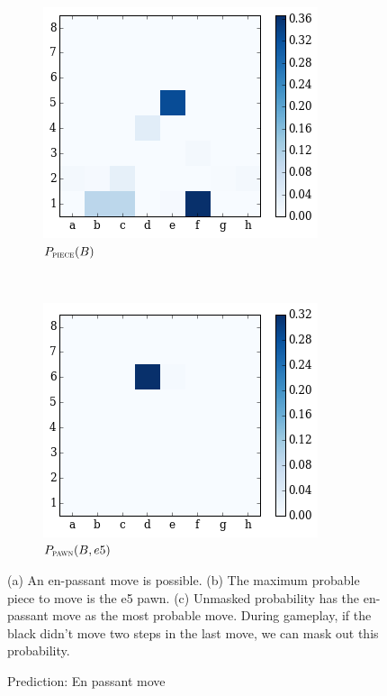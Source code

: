 \begin{figure}[H]
 \hspace*{-0.5in}  
    \begin{subfigure}[t]{0.5\textwidth}
        \centering
        \includegraphics[width=\textwidth]{img/best_moves/output_38_2.png}
        \caption{$P_{\textsc{piece}}(B)$}
    \end{subfigure}
    ~
  \centering
    \begin{subfigure}[t]{0.5\textwidth}
        \centering
        \includegraphics[width=\textwidth]{img/best_moves/output_38_6.png}
        \caption{$P_{\textsc{pawn}}(B, e5)$}
    \end{subfigure}%
    \caption{Prediction: En passant move}
    \small
    \justifying
    (a) An en-passant move is possible. (b) The maximum probable piece to move 
is the e5 pawn. (c) Unmasked probability has the en-passant move as the most 
probable move. During gameplay, if the black didn't move two steps in the last 
move, we can mask out this probability.
\label{figure:enpassant}
\end{figure}

